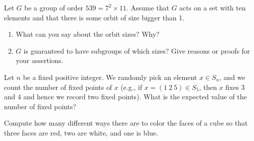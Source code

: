 \documentclass[12pt,letterpaper,boxed]{hmcpset}
\begin{document}
\begin{solution}
\end{solution}

\clearpage

\begin{problem}[7.2.6]
Let $G$ be a group of order $ 539 = 7^2 \times 11 $. Assume that $G$ acts on a set with ten elements and that there is some orbit of size bigger than 1. 
\begin{enumerate}[label=\alph*]
\item What can you say about the orbit sizes? Why?
\item $G$ is guaranteed to have subgroups of which sizes? Give reasons or proofs for your assertions. 
\end{enumerate}
\end{problem}

\begin{solution}
\end{solution}

\clearpage


\begin{problem}[8.1.3]
Let $n$ be a fixed positive integer. We randomly pick an element $ x \in S_n $, and we count the number of fixed points of $x$ (e.g., if $ x = (1 \ 2 \ 5) \in S_5 $, then $x$ fixes 3 and 4 and hence we record two fixed points). What is the expected value of the number of fixed points?
\end{problem}

\begin{solution}
\end{solution}

\clearpage

\begin{problem}[8.2.1]
Compute how many different ways there are to color the faces of a cube so that three faces are red, two are white, and one is blue. 
\end{problem}

\begin{solution}

\end{solution}
\end{document}
